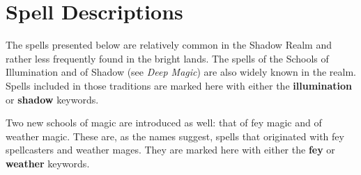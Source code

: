 \documentclass[10pt,a4paper,twoside,bg=print,twocolumn,openany,nodeprecatedcode]{dndbook}
\begin{document}
\section{Spell Descriptions}
The spells presented below are relatively common in the Shadow Realm and rather less frequently found in the bright lands. The spells of the Schools of Illumination and of Shadow (see \textit{Deep Magic}) are also widely known in the realm. Spells included in those traditions are marked here with either the \textbf{illumination} or \textbf{shadow} keywords.

Two new schools of magic are introduced as well: that of fey magic and of weather magic. These are, as the names suggest, spells that originated with fey spellcasters and weather mages. They are marked here with either the \textbf{fey} or \textbf{weather} keywords.
\end{document}
